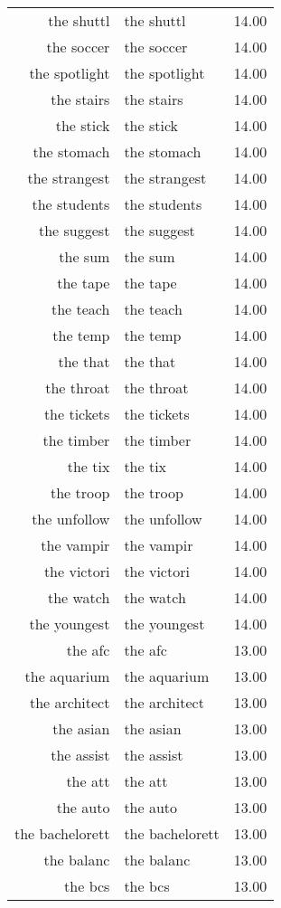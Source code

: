 \begin{table}[ht]
\begin{tabular}{rlr}
  the shuttl & the shuttl & 14.00 \\ 
  the soccer & the soccer & 14.00 \\ 
  the spotlight & the spotlight & 14.00 \\ 
  the stairs & the stairs & 14.00 \\ 
  the stick & the stick & 14.00 \\ 
  the stomach & the stomach & 14.00 \\ 
  the strangest & the strangest & 14.00 \\ 
  the students & the students & 14.00 \\ 
  the suggest & the suggest & 14.00 \\ 
  the sum & the sum & 14.00 \\ 
  the tape & the tape & 14.00 \\ 
  the teach & the teach & 14.00 \\ 
  the temp & the temp & 14.00 \\ 
  the that & the that & 14.00 \\ 
  the throat & the throat & 14.00 \\ 
  the tickets & the tickets & 14.00 \\ 
  the timber & the timber & 14.00 \\ 
  the tix & the tix & 14.00 \\ 
  the troop & the troop & 14.00 \\ 
  the unfollow & the unfollow & 14.00 \\ 
  the vampir & the vampir & 14.00 \\ 
  the victori & the victori & 14.00 \\ 
  the watch & the watch & 14.00 \\ 
  the youngest & the youngest & 14.00 \\ 
  the afc & the afc & 13.00 \\ 
  the aquarium & the aquarium & 13.00 \\ 
  the architect & the architect & 13.00 \\ 
  the asian & the asian & 13.00 \\ 
  the assist & the assist & 13.00 \\ 
  the att & the att & 13.00 \\ 
  the auto & the auto & 13.00 \\ 
  the bachelorett & the bachelorett & 13.00 \\ 
  the balanc & the balanc & 13.00 \\ 
  the bcs & the bcs & 13.00 \\ 

\end{tabular}
\end{table}
